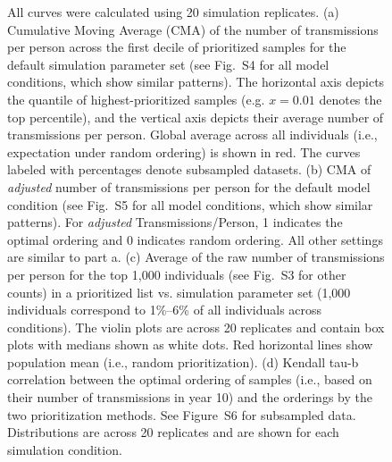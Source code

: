 \documentclass[a4paper,11pt]{article}
\newcommand{\PLWH}{sample\xspace}
\begin{document}
\begin{figure}[!tp]
{All curves were calculated using 20 simulation replicates.
(a) Cumulative Moving Average (CMA) of the number of transmissions per person across the first decile of prioritized \PLWH{s} for the default simulation parameter set (see Fig.~S4 for all model conditions, which show similar patterns).
The horizontal axis depicts the quantile of highest-prioritized \PLWH{s} (e.g. $x=0.01$ denotes the top percentile), and the vertical axis depicts their average number of transmissions per person.
Global average across all individuals (i.e., expectation under random ordering) is shown in red.
The curves labeled with percentages denote subsampled datasets.
(b) CMA of \textit{adjusted} number of transmissions per person for the default model condition (see Fig.~S5 for all model conditions, which show similar patterns). 
For \textit{adjusted} Transmissions/Person, 1 indicates the optimal ordering and 0 indicates  random ordering.
All other settings are similar to part a. 
(c) Average of the raw number of transmissions per person for the top 1,000 individuals (see Fig.~S3 for other counts) in a prioritized list vs. simulation parameter set (1,000 individuals correspond to 1\%--6\% of all individuals across conditions). The violin plots are across 20 replicates and contain box plots with medians shown as white dots.
Red horizontal lines show population mean (i.e., random prioritization).
(d) Kendall tau-b correlation between the optimal ordering of \PLWH{s} (i.e., based on their number of transmissions in year 10) and the orderings by the two prioritization methods.
See Figure~S6 for subsampled data. 
Distributions are across 20 replicates and are shown for each simulation condition. 
}\label{fig:efficacy-main}
\end{figure}











\end{document}
